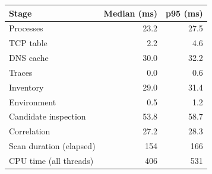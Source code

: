 \begin{tabular}{@{}l r r@{}}
\toprule
Stage & Median (ms) & p95 (ms) \\
\midrule
Processes & 23.2 & 27.5 \\
TCP table & 2.2 & 4.6 \\
DNS cache & 30.0 & 32.2 \\
Traces & 0.0 & 0.6 \\
Inventory & 29.0 & 31.4 \\
Environment & 0.5 & 1.2 \\
Candidate inspection & 53.8 & 58.7 \\
Correlation & 27.2 & 28.3 \\
\midrule
Scan duration (elapsed) & 154 & 166 \\
CPU time (all threads) & 406 & 531 \\
\bottomrule
\end{tabular}
